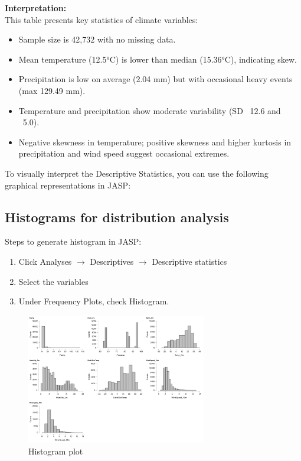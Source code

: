 \textbf{Interpretation:}\\
This table presents key statistics of climate variables:

\begin{itemize}
    \item Sample size is 42,732 with no missing data.
    \item Mean temperature (12.5°C) is lower than median (15.36°C), indicating skew.
    \item Precipitation is low on average (2.04 mm) but with occasional heavy events (max 129.49 mm).
    \item Temperature and precipitation show moderate variability (SD ~12.6 and ~5.0).
    \item Negative skewness in temperature; positive skewness and higher kurtosis in precipitation and wind speed suggest occasional extremes.
\end{itemize}

To visually interpret the Descriptive Statistics, you can use the following graphical representations in JASP:

\subsection*{Histograms for distribution analysis}

Steps to generate histogram in JASP:

\begin{enumerate}
    \item Click Analyses $\rightarrow$ Descriptives $\rightarrow$ Descriptive statistics
    \item Select the variables
    \item Under Frequency Plots, check Histogram.
\end{enumerate}

\begin{figure}[h]
\centering
\includegraphics[width=0.7\textwidth]{figures/histogram.png}
\caption{Histogram plot}
\end{figure}

